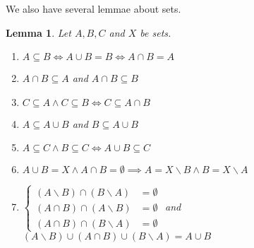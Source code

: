 \documentclass[a4paper]{book}
\theoremstyle{break}
\newtheorem{lemma}{Lemma}[section]
\begin{document}
			We also have several lemmae about sets.
			\begin{lemma}
				Let $A,B,C$ and $X$ be sets.
				\begin{enumerate}[label=($\alph*$)]
					\item $A\subseteq B\iff A\cup B=B\iff A\cap B=A$
					\item $A\cap B\subseteq A$ and $A\cap B\subseteq B$
					\item $C\subseteq A\land C\subseteq B\iff C\subseteq A\cap B$
					\item $A\subseteq A\cup B$ and $B\subseteq A\cup B$
					\item $A\subseteq C\land B\subseteq C\iff A\cup B\subseteq C$
					\item $A\cup B=X\land A\cap B=\emptyset\implies A=X\backslash B\land B=X\backslash A$
					\item 	$\left\{
									\begin{aligned}
										(A\backslash B)\cap (B\backslash A)&=\emptyset\\
										(A\cap B)\cap (A\backslash B)&=\emptyset\\
										(A\cap B)\cap (B\backslash A)&=\emptyset
									\end{aligned}
									\right.$ and $(A\backslash B)\cup(A\cap B)\cup(B\backslash A)=A\cup B$
				\end{enumerate}
			\end{lemma}
\end{document}
